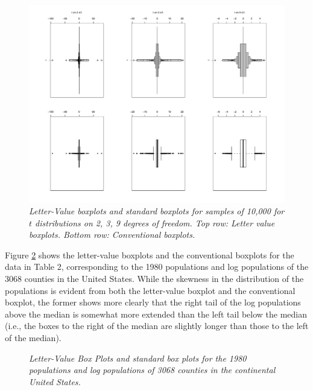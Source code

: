\documentclass[11pt]{article}
\begin{document}
\begin{figure}[hbt]
\begin{center}
\includegraphics[scale=.5,angle=270]{tplot2kk}
\caption{\it \label{t-dist} Letter-Value boxplots and standard boxplots 
for samples of 10,000 for $t$ distributions on 2, 3, 9 degrees of freedom. 
Top row: Letter value boxplots.  Bottom row: Conventional boxplots.}
\end{center}
\end{figure}

\clearpage

Figure \ref{lvpops} shows the letter-value boxplots
and the conventional boxplots for the data in Table 2,
corresponding to the 1980 populations and log populations
of the 3068 counties in the United States.  While the
skewness in the distribution of the populations is
evident from both the letter-value boxplot and the
conventional boxplot, the former shows more clearly
that the right tail of the log populations above the 
median is somewhat more extended than the left tail
below the median (i.e., the boxes to the right of
the median are slightly longer than those to the
left of the median).


\begin{figure}[hbt]
\begin{center}
\caption{\it \label{lvpops} Letter-Value Box Plots and standard 
box plots for the 1980 populations and log populations of 3068
counties in the continental United States.}
\end{center}
\end{figure}
\end{document}
